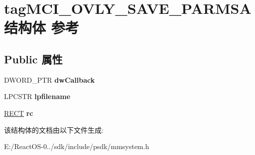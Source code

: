 \hypertarget{structtag_m_c_i___o_v_l_y___s_a_v_e___p_a_r_m_s_a}{}\section{tag\+M\+C\+I\+\_\+\+O\+V\+L\+Y\+\_\+\+S\+A\+V\+E\+\_\+\+P\+A\+R\+M\+S\+A结构体 参考}
\label{structtag_m_c_i___o_v_l_y___s_a_v_e___p_a_r_m_s_a}
\subsection*{Public 属性}
\begin{DoxyCompactItemize}
\item 
\mbox{\label{structtag_m_c_i___o_v_l_y___s_a_v_e___p_a_r_m_s_a_a4074d11e799cf6b6369b0517aa771513}} 
D\+W\+O\+R\+D\+\_\+\+P\+TR {\bfseries dw\+Callback}
\item 
\mbox{\label{structtag_m_c_i___o_v_l_y___s_a_v_e___p_a_r_m_s_a_ac212af65fda509793e4084fab73a6ef9}} 
L\+P\+C\+S\+TR {\bfseries lpfilename}
\item 
\mbox{\label{structtag_m_c_i___o_v_l_y___s_a_v_e___p_a_r_m_s_a_ac1f8d1707f643b44ec2fb9fd30543c09}} 
\hyperlink{structtag_r_e_c_t}{R\+E\+CT} {\bfseries rc}
\end{DoxyCompactItemize}


该结构体的文档由以下文件生成\+:\begin{DoxyCompactItemize}
\item 
E\+:/\+React\+O\+S-\/0../sdk/include/psdk/mmsystem.\+h\end{DoxyCompactItemize}
